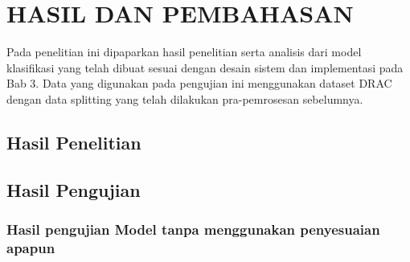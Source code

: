 \chapter{HASIL DAN PEMBAHASAN}
Pada penelitian ini dipaparkan hasil penelitian serta analisis dari model klasifikasi yang telah dibuat sesuai dengan desain sistem dan implementasi pada Bab 3. Data yang digunakan pada pengujian ini menggunakan dataset DRAC dengan data splitting yang telah dilakukan pra-pemrosesan sebelumnya.
\section{Hasil Penelitian}

\section{Hasil Pengujian}
\subsection{Hasil pengujian Model tanpa menggunakan penyesuaian apapun}

